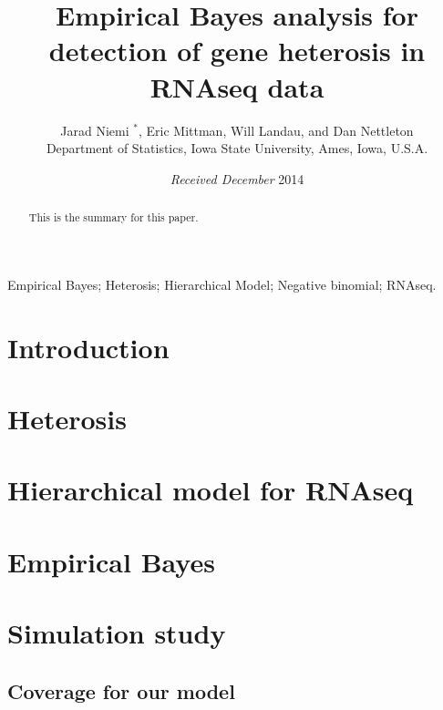 \documentclass[useAMS,referee]{biom}
\title[Empirical Bayes analysis for detection of gene heterosis in RNAseq data]{Empirical Bayes analysis for detection of gene heterosis in RNAseq data}
\author{Jarad Niemi $^*$\email{niemi@iastate.edu}, 
Eric Mittman, 
Will Landau, and 
Dan Nettleton \\
Department of Statistics, Iowa State University, Ames, Iowa, U.S.A.}
\begin{document}
\date{{\it Received December} 2014} 

\pagerange{\pageref{firstpage}--\pageref{lastpage}} 
\doi{}

\label{firstpage}


\begin{abstract}
This is the summary for this paper.
\end{abstract}

\begin{keywords}
Empirical Bayes; Heterosis; Hierarchical Model; Negative binomial; RNAseq.
\end{keywords}

\maketitle


\section{Introduction}
\label{s:intro}

\section{Heterosis}
\label{s:heterosis}

\section{Hierarchical model for RNAseq}
\label{s:model}


\section{Empirical Bayes}
\label{s:inf}

\section{Simulation study}
\label{s:simulation}

\subsection{Coverage for our model}
\end{document}
